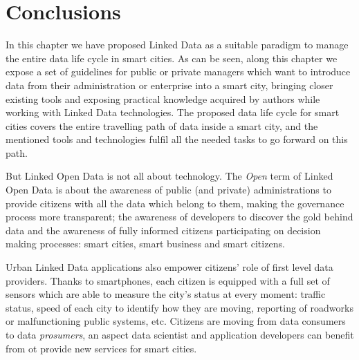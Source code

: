 \section{Conclusions}

In this chapter we have proposed Linked Data as a suitable paradigm to manage the entire data life cycle in smart cities. As can be seen, along this chapter we expose a set of guidelines for public or private managers which want to introduce data from their administration or enterprise into a smart city, bringing closer existing tools and exposing practical knowledge acquired by authors while working with Linked Data technologies. The proposed data life cycle for smart cities covers the entire travelling path of data inside a smart city, and the mentioned tools and technologies fulfil all the needed tasks to go forward on this path.

But Linked Open Data is not all about technology. The \textit{Open} term of Linked Open Data is about the awareness of public (and private) administrations to provide citizens with all the data which belong to them, making the governance process more transparent; the awareness of developers to discover the gold behind data and the awareness of fully informed citizens participating on decision making processes: smart cities, smart business and smart citizens.

Urban Linked Data applications also empower citizens' role of first level data providers. Thanks to smartphones, each citizen is equipped with a full set of sensors which are able to measure the city's status at every moment: traffic status, speed of each city to identify how they are moving, reporting of roadworks or malfunctioning public systems, etc. Citizens are moving from data consumers to data \textit{prosumers}, an aspect data scientist and application developers can benefit from ot provide new services for smart cities.
